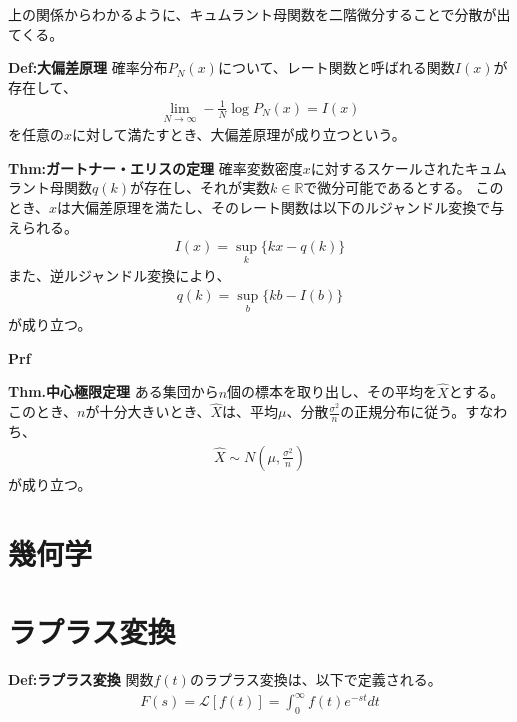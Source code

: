 \documentclass[a4paper,11pt]{jsarticle}
\numberwithin{equation}{section}
\begin{document}
上の関係からわかるように、キュムラント母関数を二階微分することで分散が出てくる。

\begin{itembox}[l]{\textbf{Def:大偏差原理}}
  確率分布$P_N(x)$について、レート関数と呼ばれる関数$I(x)$が存在して、
  \begin{align}
    \lim_{N \to \infty} -\frac{1}{N} \log P_N(x) = I(x)
  \end{align}
  を任意の$x$に対して満たすとき、大偏差原理が成り立つという。
\end{itembox}

\begin{itembox}[l]{\textbf{Thm:ガートナー・エリスの定理}}
  確率変数密度$x$に対するスケールされたキュムラント母関数$q(k)$が存在し、それが実数$k \in \mathbb{R}$で微分可能であるとする。
  このとき、$x$は大偏差原理を満たし、そのレート関数は以下のルジャンドル変換で与えられる。
  \begin{align}
    I(x) = \sup_{k} \{kx - q(k)\}
  \end{align}
  また、逆ルジャンドル変換により、
  \begin{align}
    q(k) = \sup_{b} \{kb - I(b)\}
  \end{align}
  が成り立つ。
\end{itembox}
\textbf{Prf}\\

\begin{itembox}[l]{\textbf{Thm.中心極限定理}}
  ある集団から$n$個の標本を取り出し、その平均を$\hat{X}$とする。このとき、$n$が十分大きいとき、$\hat{X}$は、平均$\mu$、分散$\frac{\sigma^2}{n}$の正規分布に従う。すなわち、
  \begin{align}
    \hat{X} \sim N\left(\mu, \frac{\sigma^2}{n}\right)
  \end{align}
  が成り立つ。

\end{itembox}

\section{幾何学}

\section{ラプラス変換}
\begin{itembox}[l]{\textbf{Def:ラプラス変換}}
  関数$f(t)$のラプラス変換は、以下で定義される。
  \begin{align}
    F(s) = \mathcal{L}[f(t)] = \int_{0}^{\infty}  f(t) e^{-st} dt
  \end{align}

\end{itembox}
\end{document}
